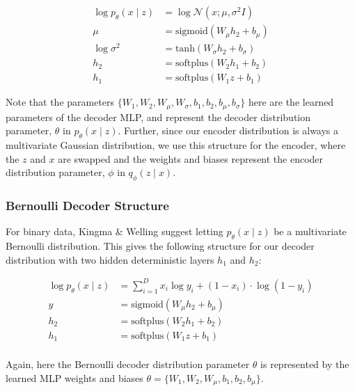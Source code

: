 \documentclass{article} %
\numberwithin{figure}{section}
\begin{document}
\begin{align*}
    \log p_\theta(x\mid z) &= \log \mathcal{N}(x; \mu, \sigma^2 I)\\
    \mu &= \text{sigmoid}(W_\mu h_2 + b_\mu)\\
    \log \sigma^2 &= \text{tanh}(W_\sigma h_2+ b_\sigma)\\
    h_2 &= \text{softplus}(W_{2} h_1 + b_{2})\\
    h_1 &= \text{softplus}(W_{1} z + b_{1})
\end{align*}

Note that the parameters $\{W_1,W_2,W_\mu,W_\sigma,b_1,b_2,b_\mu,b_\sigma\}$ here are the learned parameters of the decoder MLP, and represent the decoder distribution parameter, $\theta$ in $p_\theta(x\mid z)$. Further, since our encoder distribution is always a multivariate Gaussian distribution, we use this structure for the encoder, where the $z$ and $x$ are swapped and the weights and biases represent the encoder distribution parameter, $\phi$ in ${q_\phi(z \mid x)}$.

\subsubsection{Bernoulli Decoder Structure}
For binary data, Kingma \& Welling suggest letting ${p_\theta(x\mid z)}$ be a multivariate Bernoulli distribution. This gives the following structure for our decoder distribution with two hidden deterministic layers $h_1$ and $h_2$:

\begin{align*}
    \log p_\theta(x\mid z) &= \sum_{i=1}^D x_i \log y_i + (1-x_i) \cdot \log (1-y_i)\\
    y&=\text{sigmoid}(W_\mu h_2 + b_\mu)\\
    h_2&= \text{softplus}(W_2 h_1 +b_2)\\
    h_1 &= \text{softplus}(W_1 z + b_1)\\
\end{align*}

Again, here the Bernoulli decoder distribution parameter $\theta$ is represented by the learned MLP weights and biases $\theta = \{W_1,W_2,W_\mu,b_1,b_2,b_\mu\}$.
\end{document}
